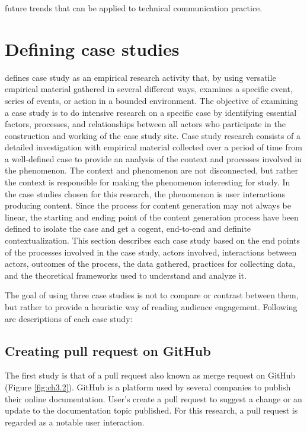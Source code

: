 future trends that can be applied to technical communication practice.

\section{Defining case studies}
\textcite{Yin_1994} defines case study as an empirical research activity that, by using versatile empirical material gathered in several different ways, examines a specific event, series of events, or action in a bounded environment. The objective of examining a case study is to do intensive research on a specific case by identifying essential factors, processes, and relationships between all actors who participate in the construction and working of the case study site. Case study research consists of a detailed investigation with empirical material collected over a period of time from a well-defined case to provide an analysis of the context and processes involved in the phenomenon. The context and phenomenon are not disconnected, but rather the context is responsible for making the phenomenon interesting for study. In the case studies chosen for this research, the phenomenon is user interactions producing content. Since the process for content generation may not always be linear, the starting and ending point of the content generation process have been defined to isolate the case and get a cogent, end-to-end and definite contextualization.  This section describes each case study based on the end points of the processes involved in the case study, actors involved, interactions between actors, outcomes of the process, the data gathered, practices for collecting data, and the theoretical frameworks used to understand and analyze it.

The goal of using three case studies is not to compare or contrast between them, but rather to provide a heuristic way of reading audience engagement. Following are descriptions of each case study:

\subsection{Creating pull request on GitHub}
The first study is that of a pull request also known as merge request on GitHub (Figure \ref{fig:ch3.2}). GitHub is a platform used by several companies to publish their online documentation. User's create a pull request to suggest a change or an update to the documentation topic published. For this research, a pull request is regarded as a notable user interaction.

